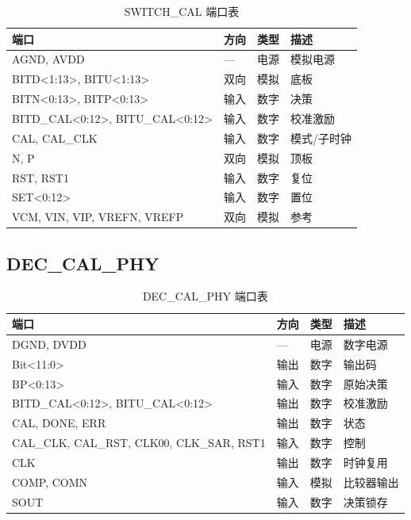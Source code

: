 \documentclass[UTF8,a4paper,11pt]{ctexart}
\begin{document}
\begin{table}[H]
\centering
\caption{SWITCH\_CAL 端口表}
\label{tab:app-sw-ports}
\scriptsize
\begin{tabular}{llll}
\toprule
端口 & 方向 & 类型 & 描述 \\
\midrule
AGND, AVDD                       & --- & 电源 & 模拟电源 \\
BITD<1:13>, BITU<1:13>           & 双向 & 模拟 & 底板 \\
BITN<0:13>, BITP<0:13>           & 输入 & 数字 & 决策 \\
BITD\_CAL<0:12>, BITU\_CAL<0:12> & 输入 & 数字 & 校准激励 \\
CAL, CAL\_CLK                    & 输入 & 数字 & 模式/子时钟 \\
N, P                             & 双向 & 模拟 & 顶板 \\
RST, RST1                        & 输入 & 数字 & 复位 \\
SET<0:12>                        & 输入 & 数字 & 置位 \\
VCM, VIN, VIP, VREFN, VREFP      & 双向 & 模拟 & 参考 \\
\bottomrule
\end{tabular}
\end{table}

\subsection{DEC\_CAL\_PHY}

\begin{table}[H]
\centering
\caption{DEC\_CAL\_PHY 端口表}
\label{tab:app-dec-ports}
\scriptsize
\begin{tabular}{llll}
\toprule
端口 & 方向 & 类型 & 描述 \\
\midrule
DGND, DVDD                       & --- & 电源 & 数字电源 \\
Bit<11:0>                        & 输出 & 数字 & 输出码 \\
BP<0:13>                         & 输入 & 数字 & 原始决策 \\
BITD\_CAL<0:12>, BITU\_CAL<0:12> & 输出 & 数字 & 校准激励 \\
CAL, DONE, ERR                   & 输出 & 数字 & 状态 \\
CAL\_CLK, CAL\_RST, CLK00, CLK\_SAR, RST1 & 输入 & 数字 & 控制 \\
CLK                              & 输出 & 数字 & 时钟复用 \\
COMP, COMN                       & 输入 & 模拟 & 比较器输出 \\
SOUT                             & 输入 & 数字 & 决策锁存 \\
\bottomrule
\end{tabular}
\end{table}
\end{document}
